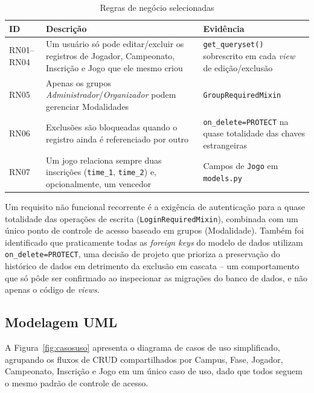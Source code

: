 \documentclass[12pt]{article}
\begin{document}
\begin{table}[ht]
\centering
\caption{Regras de negócio selecionadas}
\label{tab:rn}
\small
\begin{tabular}{@{}p{0.9cm}p{6.6cm}p{4.6cm}@{}}
\toprule
\textbf{ID} & \textbf{Descrição} & \textbf{Evidência} \\
\midrule
RN01--RN04 & Um usuário só pode editar/excluir os registros de Jogador, Campeonato, Inscrição e Jogo que ele mesmo criou & \texttt{get\_queryset()} sobrescrito em cada \emph{view} de edição/exclusão \\
RN05 & Apenas os grupos \emph{Administrador}/\emph{Organizador} podem gerenciar Modalidades & \texttt{GroupRequiredMixin} \\
RN06 & Exclusões são bloqueadas quando o registro ainda é referenciado por outro & \texttt{on\_delete=PROTECT} na quase totalidade das chaves estrangeiras \\
RN07 & Um jogo relaciona sempre duas inscrições (\texttt{time\_1}, \texttt{time\_2}) e, opcionalmente, um vencedor & Campos de \texttt{Jogo} em \texttt{models.py} \\
\bottomrule
\end{tabular}
\end{table}

Um requisito não funcional recorrente é a exigência de autenticação para a
quase totalidade das operações de escrita (\texttt{LoginRequiredMixin}),
combinada com um único ponto de controle de acesso baseado em grupos
(Modalidade). Também foi identificado que praticamente todas as
\emph{foreign keys} do modelo de dados utilizam \texttt{on\_delete=PROTECT},
uma decisão de projeto que prioriza a preservação do histórico de dados em
detrimento da exclusão em cascata -- um comportamento que só pôde ser
confirmado ao inspecionar as migrações do banco de dados, e não apenas o
código de \emph{views}.

\subsection{Modelagem UML}

A Figura~\ref{fig:casosuso} apresenta o diagrama de casos de uso
simplificado, agrupando os fluxos de CRUD compartilhados por Campus, Fase,
Jogador, Campeonato, Inscrição e Jogo em um único caso de uso, dado que todos
seguem o mesmo padrão de controle de acesso.
\end{document}
